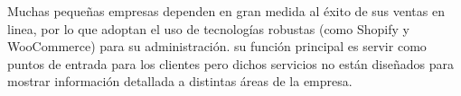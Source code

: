 \setcounter{page}{1}  %
\thispagestyle{empty}  %
Muchas pequeñas empresas dependen en gran medida al éxito de sus ventas en linea,
por lo que adoptan el uso de tecnologías robustas (como Shopify y WooCommerce) para su administración.
su función principal es servir como puntos de entrada para los clientes pero
dichos servicios no están diseñados para mostrar información detallada a distintas áreas de la empresa.